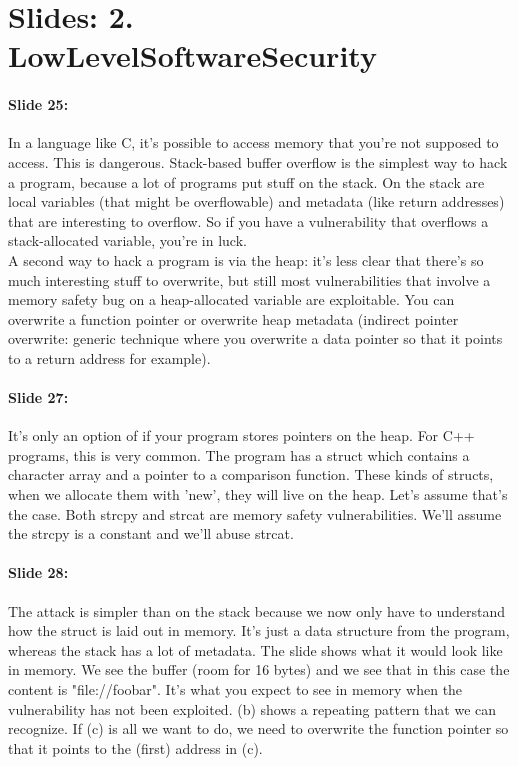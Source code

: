 \documentclass[10pt,a4paper]{report}
\begin{document}
\section{Slides: 2. LowLevelSoftwareSecurity}

\paragraph{Slide 25:} In a language like C, it's possible to access memory that you're not supposed to access. This is dangerous.
Stack-based buffer overflow is the simplest way to hack a program, because a lot of programs put stuff on the stack. On the stack are local variables (that might be overflowable) and metadata (like return addresses) that are interesting to overflow. So if you have a vulnerability that overflows a stack-allocated variable, you're in luck.\\
A second way to hack a program is via the heap: it's less clear that there's so much interesting stuff to overwrite, but still most vulnerabilities that involve a memory safety bug on a heap-allocated variable are exploitable. You can overwrite a function pointer or overwrite heap metadata (indirect pointer overwrite: generic technique where you overwrite a data pointer so that it points to a return address for example).

\paragraph{Slide 27:} It's only an option of if your program stores pointers on the heap. For C++ programs, this is very common. The program has a struct which contains a character array and a pointer to a comparison function.
These kinds of structs, when we allocate them with 'new', they will live on the heap. Let's assume that's the case. Both strcpy and strcat are memory safety vulnerabilities. We'll assume the strcpy is a constant and we'll abuse strcat.

\paragraph{Slide 28:} The attack is simpler than on the stack because we now only have to understand how the struct is laid out in memory. It's just a data structure from the program, whereas the stack has a lot of metadata.
The slide shows what it would look like in memory. We see the buffer (room for 16 bytes) and we see that in this case the content is "file://foobar". It's what you expect to see in memory when the vulnerability has not been exploited. (b) shows a repeating pattern that we can recognize. If (c) is all we want to do, we need to overwrite the function pointer so that it points to the (first) address in (c).
\end{document}
